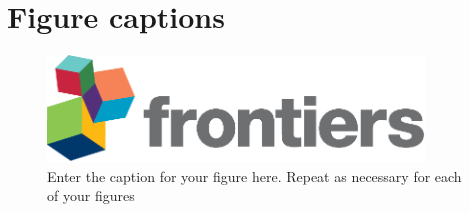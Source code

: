 \documentclass[utf8]{FrontiersinVancouver} %
\begin{document}
% 





\section*{Figure captions}



\begin{figure}[h!]
\begin{center}
\includegraphics[width=10cm]{logo1}%
\end{center}
\caption{ Enter the caption for your figure here.  Repeat as  necessary for each of your figures}\label{fig:1}
\end{figure}
\end{document}
